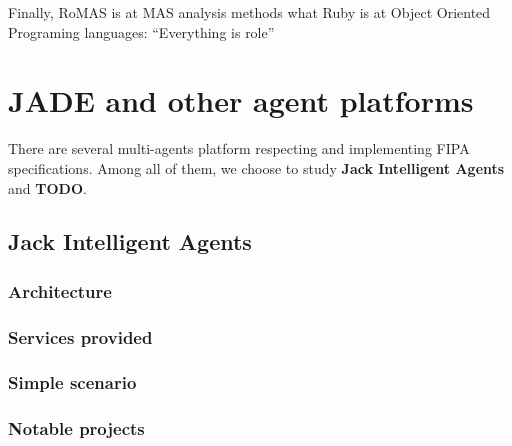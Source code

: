 \documentclass[a4paper,11pt]{report}
\begin{document}
  Finally, RoMAS is at MAS analysis methods what Ruby is at Object Oriented Programing 
  languages: ``Everything is role''
  
  
  \section{JADE and other agent platforms} %
  
  
  
  
  There are several multi-agents platform respecting and implementing FIPA 
  specifications. Among all of them, we choose to study \textbf{Jack Intelligent 
  Agents} and \textbf{TODO}. %
  
  \subsection{Jack Intelligent Agents}
  
  \subsubsection{Architecture}
  
  \subsubsection{Services provided}
  
  \subsubsection{Simple scenario}
  
  \subsubsection{Notable projects}
  
\end{document}
